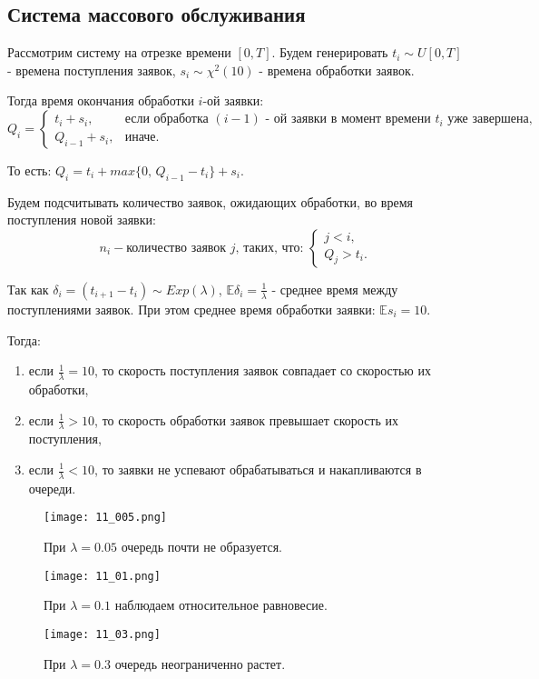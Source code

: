 \documentclass[a4paper, 11pt]{article}
\theoremstyle{def}
\theoremstyle{th}
\theoremstyle{rem}
\begin{document}
\subsection{Система массового обслуживания}

Рассмотрим систему на отрезке времени $[0, T]$. Будем генерировать $t_i \sim U[0, T]$ - времена поступления заявок, $s_i \sim \chi^2(10)$ - времена обработки заявок.

Тогда время окончания обработки $i$-ой заявки:
$$
Q_i = 
\begin{equation*}
 \begin{cases}
   t_i + s_i,&\text{если обработка $(i-1)$ - ой заявки в момент времени $t_i$ уже завершена,} 
   \\
   Q_{i-1} + s_i,&\text{иначе.}
 \end{cases}
\end{equation*}
$$

То есть: $Q_i = t_i + max\{0, \,Q_{i-1} - t_i\} + s_i.$

Будем подсчитывать количество заявок, ожидающих обработки, во время поступления новой заявки:
$$
n_i - \text{количество заявок $j$, таких, что: } 
\begin{equation*}
 \begin{cases}
   j<i, 
   \\
   Q_j > t_i.
 \end{cases}
\end{equation*} 
$$

Так как $\delta_i = (t_{i+1} - t_i) \sim Exp(\lambda)$, $\mathbb{E}\delta_i = \frac{1}{\lambda}$ - среднее время между поступлениями заявок. При этом среднее время обработки заявки: $\mathbb{E}s_i = 10$.

Тогда:
\begin{enumerate}
    \item если $\frac{1}{\lambda} = 10$, то скорость поступления заявок совпадает со скоростью их обработки,
    \item если $\frac{1}{\lambda} > 10$, то скорость обработки заявок превышает скорость их поступления,
    \item если $\frac{1}{\lambda} < 10$, то заявки не успевают обрабатываться и накапливаются в очереди.
\end{enumerate}

\begin{figure}[H]
        \noindent
        \centering
        {
        \texttt{[image: 11\_005.png]}}
        \caption{При $\lambda = 0.05$ очередь почти не образуется.} 
\end{figure}
\begin{figure}[H]
\noindent
        \centering
        {
        \texttt{[image: 11\_01.png]}}
        \caption{При $\lambda = 0.1$ наблюдаем относительное равновесие.}
\end{figure}
\begin{figure}[H]
\noindent
        \centering
        {
        \texttt{[image: 11\_03.png]}}
        \caption{При $\lambda =0.3$ очередь неограниченно растет.}
\end{figure}
\end{document}
